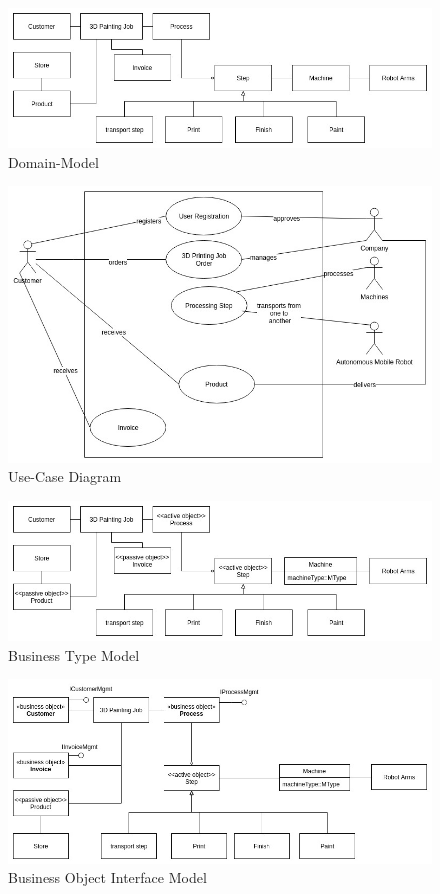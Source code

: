 \documentclass[aspectratio=1610,onlymath]{beamer}
\begin{document}
\begin{figure}[ht]
\centering
\includegraphics[width=1\textwidth]{01_domain-model}
\caption{Domain-Model}
\end{figure}

\begin{figure}[ht]
\centering
\includegraphics[width=1\textwidth]{02_use-case}
\caption{Use-Case Diagram}
\end{figure}

\begin{figure}[ht]
\centering
\includegraphics[width=1\textwidth]{03_business-type-model}
\caption{Business Type Model}
\end{figure}

\begin{figure}[ht]
\centering
\includegraphics[width=1\textwidth]{04_business-object-interface-model}
\caption{Business Object Interface Model}
\end{figure}
\end{document}
